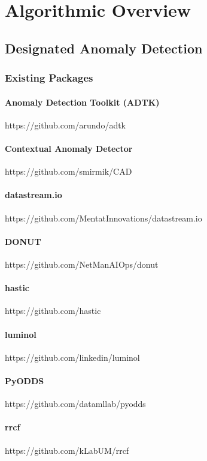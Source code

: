 \section{Algorithmic Overview}
\subsection{Designated Anomaly Detection}
\subsubsection{Existing Packages}
\paragraph{Anomaly Detection Toolkit (ADTK)}
https://github.com/arundo/adtk

\paragraph{Contextual Anomaly Detector}
https://github.com/smirmik/CAD

\paragraph{datastream.io}
https://github.com/MentatInnovations/datastream.io

\paragraph{DONUT}
https://github.com/NetManAIOps/donut

\paragraph{hastic}
https://github.com/hastic

\paragraph{luminol}
https://github.com/linkedin/luminol

\paragraph{PyODDS}
https://github.com/datamllab/pyodds

\paragraph{rrcf}
https://github.com/kLabUM/rrcf

